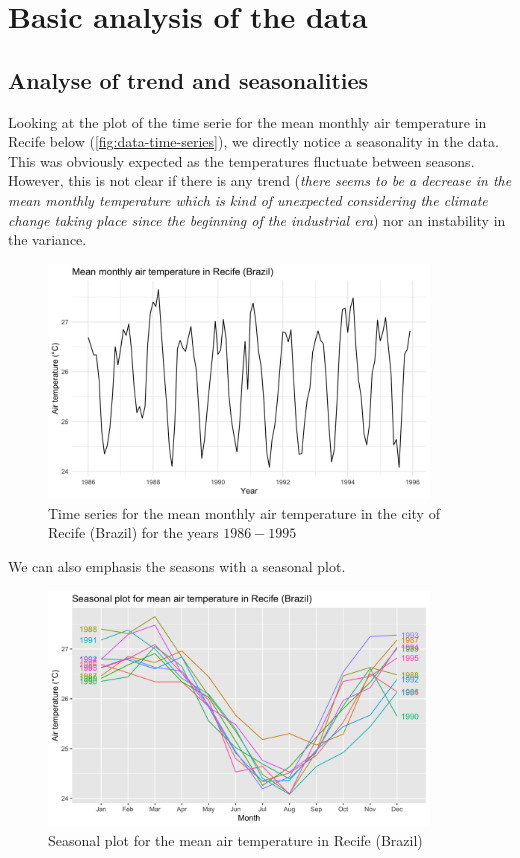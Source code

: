 \section{Basic analysis of the data}

\subsection{Analyse of trend and seasonalities}

Looking at the plot of the time serie for the mean monthly air temperature in Recife below (\autoref{fig:data-time-series}), we directly notice a seasonality in the data. This was obviously expected as the temperatures fluctuate between seasons. However, this is not clear if there is any trend (\textit{there seems to be a decrease in the mean monthly temperature which is kind of unexpected considering the climate change taking place since the beginning of the industrial era}) nor an instability in the variance.

\begin{figure}[H]
	\centering
	\includegraphics[width=0.9\textwidth]{figures/basic_analysis/data_time_series.png}
	\caption{Time series for the mean monthly air temperature in the city of Recife (Brazil) for the years $1986-1995$}
	\label{fig:data-time-series}
\end{figure}

We can also emphasis the seasons with a seasonal plot. 
\begin{figure}[H]
	\centering
	\includegraphics[width=0.9\textwidth]{figures/basic_analysis/time_serie_seasonal_plot.png}
	\caption{Seasonal plot for the mean air temperature in Recife (Brazil)}
	\label{fig:seasonal-plot}
\end{figure}

